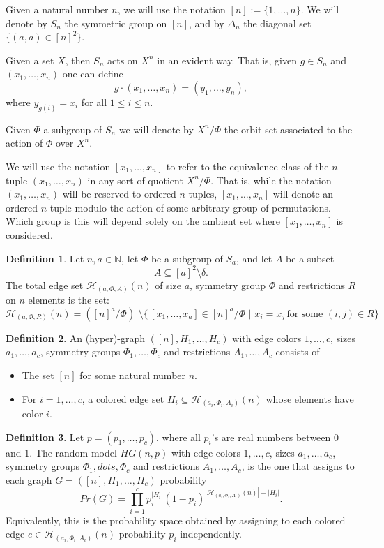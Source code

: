 \documentclass[11pt,notitlepage]{report}
\theoremstyle{definition}
\newtheorem{definition}{Definition}[chapter]
\newcommand{\N}{\mathbb{N}}
\begin{document}
Given a natural number $n$, we will use the notation
$[n]:= \{1,\dots, n\}$. We will denote by $S_n$
the symmetric group on $[n]$, and by $\Delta_n$ the 
diagonal set $\{(a,a)\in [n]^2 \}$. \par
Given a set $X$, then $S_n$ acts on $X^n$ in an evident way. That is, 
given $g\in S_n$ and $(x_1, \dots, x_n)$ one can define
\[ g \cdot (x_1,\dots,x_n) =(y_1,\dots,y_n), \]
where $y_{g(i)}=x_i$ for all $1\leq i\leq n$.\par
Given $\Phi$ a subgroup of $S_n$ we will denote by $X^n/\Phi$
the orbit set associated to the action of $\Phi$ over $X^n$.\par
We will use the notation $[x_1,\dots,x_n]$ to refer to the 
equivalence class of the $n$-tuple $(x_1,\dots, x_n)$ in 
any sort of quotient $X^n/\Phi$. That is, while the notation
$(x_1,\dots, x_n)$ will be reserved to ordered $n$-tuples, 
$[x_1,\dots,x_n]$ will denote an ordered $n$-tuple modulo the
action of some arbitrary group of permutations. Which group is this 
will depend solely on the ambient set where $[x_1,\dots,x_n]$ is
considered.
\par


\begin{definition}
	Let $n,a\in \N$, let $\Phi$ be a subgroup of $S_a$, and let
	$A$ be a subset 
	\[ A\subseteq [a]^2 \setminus \delta.\]
	The total edge set $\mathcal{H}_{(a,\Phi, A)}(n)$ of size $a$, 
	symmetry group $\Phi$ and
	restrictions $R$ on $n$ elements is the set:
	\[  \mathcal{H}_{(a,\Phi, R)}(n)= ([n]^a/\Phi) \, \,
	\setminus \{\,  [x_1, \dots,x_a] \in [n]^a/\Phi  \, \, 
	| \, \, x_i=x_j \, \text{for some } (i,j)\in R \} \]
\end{definition}

\begin{definition}
	An (hyper)-graph $([n], H_1,\dots, H_c)$ with edge colors 
	$1,\dots, c$, sizes $a_1,\dots,a_c$, 
	symmetry groups $\Phi_1,\dots,\Phi_c$ and 
	restrictions $A_1,\dots,A_c$ consists of 
	\begin{itemize}
		\item The set $[n]$ for some natural number $n$.
		\item For $i=1,\dots,c$, a colored edge set $H_i\subseteq \mathcal{H}_{(a_i,\Phi_i,A_i)}(n)$ whose elements 
		have color $i$.
	\end{itemize}
\end{definition}

\begin{definition} 
	Let $p=(p_1,\dots, p_c)$, where all $p_i$'s are real numbers
	between $0$ and $1$. 
	The random model $HG(n,p)$ with edge colors $1,\dots,c$,
	sizes $a_1,\dots,a_c$, 
	symmetry groups $\Phi_1,dots,\Phi_c$ 
	and restrictions $A_1,\dots,A_c$, is the one that
	assigns to each graph $G=([n], H_1,\dots, H_c)$
	probability
	\[ Pr(G)=\prod_{i=1}^{c} p_i^{|H_i|}(1-p_i)^{|\mathcal{H}_{(a_i,\Phi_i,A_i)}(n)|-|H_i|}.	
	\]
	Equivalently, this is the probability space obtained by 
	assigning to each colored edge 
	$e\in \mathcal{H}_{(a_i,\Phi_i,A_i)}(n)$ probability $p_i$ independently. 
\end{definition}
\end{document}
